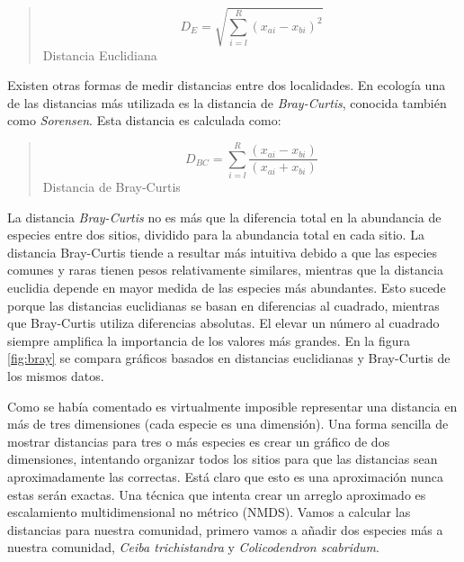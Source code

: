 \documentclass[]{book}
\newenvironment{Shaded}{\begin{snugshade}}{\end{snugshade}}
\newcommand{\KeywordTok}[1]{\textcolor[rgb]{0.13,0.29,0.53}{\textbf{{#1}}}}
\newcommand{\DecValTok}[1]{\textcolor[rgb]{0.00,0.00,0.81}{{#1}}}
\newcommand{\StringTok}[1]{\textcolor[rgb]{0.31,0.60,0.02}{{#1}}}
\newcommand{\NormalTok}[1]{{#1}}
\begin{document}
\begin{quote}
\[D_E = \sqrt{\sum_{i=l}^R (x_{ai} - x_{bi})^2}\] Distancia Euclidiana
\end{quote}

Existen otras formas de medir distancias entre dos localidades. En
ecología una de las distancias más utilizada es la distancia de
\emph{Bray-Curtis}, conocida también como \emph{Sorensen}. Esta
distancia es calculada como:

\begin{quote}
\[D_{BC} = \sum_{i=l}^R \frac{(x_{ai} - x_{bi})}{(x_{ai} + x_{bi})}\]
Distancia de Bray-Curtis
\end{quote}

La distancia \emph{Bray-Curtis} no es más que la diferencia total en la
abundancia de especies entre dos sitios, dividido para la abundancia
total en cada sitio. La distancia Bray-Curtis tiende a resultar más
intuitiva debido a que las especies comunes y raras tienen pesos
relativamente similares, mientras que la distancia euclidia depende en
mayor medida de las especies más abundantes. Esto sucede porque las
distancias euclidianas se basan en diferencias al cuadrado, mientras que
Bray-Curtis utiliza diferencias absolutas. El elevar un número al
cuadrado siempre amplifica la importancia de los valores más grandes. En
la figura \ref{fig:bray} se compara gráficos basados en distancias
euclidianas y Bray-Curtis de los mismos datos.

Como se había comentado es virtualmente imposible representar una
distancia en más de tres dimensiones (cada especie es una dimensión).
Una forma sencilla de mostrar distancias para tres o más especies es
crear un gráfico de dos dimensiones, intentando organizar todos los
sitios para que las distancias sean aproximadamente las correctas. Está
claro que esto es una aproximación nunca estas serán exactas. Una
técnica que intenta crear un arreglo aproximado es escalamiento
multidimensional no métrico (NMDS). Vamos a calcular las distancias para
nuestra comunidad, primero vamos a añadir dos especies más a nuestra
comunidad, \emph{Ceiba trichistandra} y \emph{Colicodendron scabridum}.

\begin{Shaded}
\end{Shaded}
\end{document}
